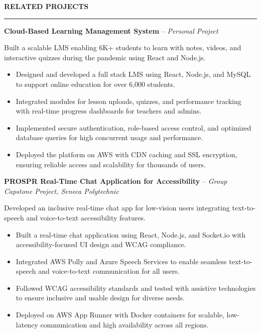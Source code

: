 \documentclass[10pt,letterpaper]{article}
\begin{document}
\vspace{6pt}

\textbf{RELATED PROJECTS}\\[-8pt]
\noindent\rule{\textwidth}{1pt}

\vspace{-2pt}

\textbf{Cloud-Based Learning Management System} -- \emph{Personal Project}

\vspace{-1pt}

Built a scalable LMS enabling 6K+ students to learn with notes, videos, and interactive quizzes during the pandemic using React and Node.js.
\vspace{-1pt}
\begin{itemize}
\item Designed and developed a full stack LMS using React, Node.js, and MySQL to support online education for over 6,000 students.
\item Integrated modules for lesson uploads, quizzes, and performance tracking with real-time progress dashboards for teachers and admins.
\item Implemented secure authentication, role-based access control, and optimized database queries for high concurrent usage and performance.
\item Deployed the platform on AWS with CDN caching and SSL encryption, ensuring reliable access and scalability for thousands of users.
\end{itemize}

\textbf{PROSPR  Real-Time Chat Application for Accessibility} -- \emph{Group Capstone Project, Seneca Polytechnic}

\vspace{-1pt}

Developed an inclusive real-time chat app for low-vision users integrating text-to-speech and voice-to-text accessibility features.
\vspace{-1pt}
\begin{itemize}
\item Built a real-time chat application using React, Node.js, and Socket.io with accessibility-focused UI design and WCAG compliance.
\item Integrated AWS Polly and Azure Speech Services to enable seamless text-to-speech and voice-to-text communication for all users.
\item Followed WCAG accessibility standards and tested with assistive technologies to ensure inclusive and usable design for diverse needs.
\item Deployed on AWS App Runner with Docker containers for scalable, low-latency communication and high availability across all regions.
\end{itemize}
\end{document}
